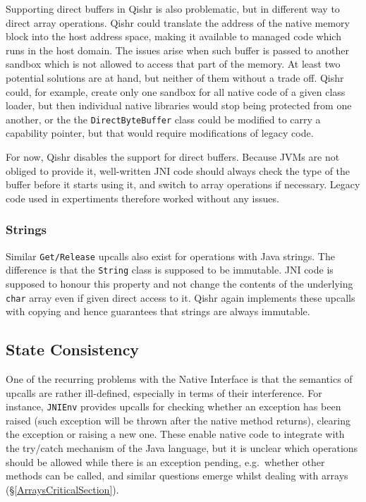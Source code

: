 \documentclass[a4paper,12pt,twoside,openright]{report}
\newcommand{\class}[1]{\texttt{#1}}
\begin{document}
Supporting direct buffers in Qishr is also problematic, but in different way to direct array operations. Qishr could translate the address of the native memory block into the host address space, making it available to managed code which runs in the host domain. The issues arise when such buffer is passed to another sandbox which is not allowed to access that part of the memory. At least two potential solutions are at hand, but neither of them without a trade off. Qishr could, for example, create only one sandbox for all native code of a given class loader, but then individual native libraries would stop being protected from one another, or the the \class{DirectByteBuffer} class could be modified to carry a capability pointer, but that would require modifications of legacy code.

For now, Qishr disables the support for direct buffers. Because JVMs are not obliged to provide it, well-written JNI code should always check the type of the buffer before it starts using it, and switch to array operations if necessary. Legacy code used in expertiments therefore worked without any issues.

\subsubsection{Strings}

Similar \texttt{Get/Release} upcalls also exist for operations with Java strings. The difference is that the \class{String} class is supposed to be immutable. JNI code is supposed to honour this property and not change the contents of the underlying \class{char} array even if given direct access to it. Qishr again implements these upcalls with copying and hence guarantees that strings are always immutable.

\subsection{State Consistency}

One of the recurring problems with the Native Interface is that the semantics of upcalls are rather ill-defined, especially in terms of their interference. For instance, \texttt{JNIEnv} provides upcalls for checking whether an exception has been raised (such exception will be thrown after the native method returns), clearing the exception or raising a new one. These enable native code to integrate with the try/catch mechanism of the Java language, but it is unclear which operations should be allowed while there is an exception pending, e.g.\ whether other methods can be called, and similar questions emerge whilst dealing with arrays (\S\ref{ArraysCriticalSection}).
\end{document}
